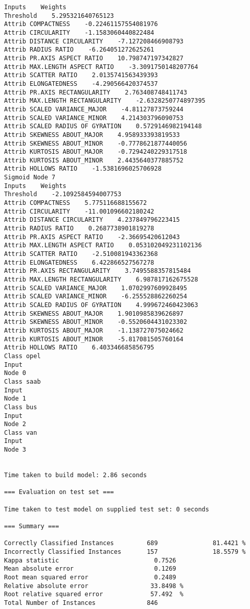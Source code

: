 \documentclass[
	article,			%
	11pt,				%
	oneside,			%
	a4paper,			%
	english,			%
	brazil,				%
	sumario=tradicional
	]{abntex2}
\begin{document}
\begin{lstlisting}
Inputs    Weights
Threshold    5.295321640765123
Attrib COMPACTNESS    -0.22461157554081976
Attrib CIRCULARITY    -1.1583060440822484
Attrib DISTANCE CIRCULARITY    -7.127208466908793
Attrib RADIUS RATIO    -6.264051272625261
Attrib PR.AXIS ASPECT RATIO    10.798747197342827
Attrib MAX.LENGTH ASPECT RATIO    -3.3091750148207764
Attrib SCATTER RATIO    2.0135741563439393
Attrib ELONGATEDNESS    -4.290566420374537
Attrib PR.AXIS RECTANGULARITY    2.763408748411743
Attrib MAX.LENGTH RECTANGULARITY    -2.6328250774897395
Attrib SCALED VARIANCE_MAJOR    -4.81127873759244
Attrib SCALED VARIANCE_MINOR    4.214303796090753
Attrib SCALED RADIUS OF GYRATION    0.5729146982194148
Attrib SKEWNESS ABOUT_MAJOR    4.958933393819533
Attrib SKEWNESS ABOUT_MINOR    -0.7778621877440056
Attrib KURTOSIS ABOUT_MAJOR    -0.7294240229317518
Attrib KURTOSIS ABOUT_MINOR    2.4435640377885752
Attrib HOLLOWS RATIO    -1.5381696025706928
Sigmoid Node 7
Inputs    Weights
Threshold    -2.1092584594007753
Attrib COMPACTNESS    5.775116688155672
Attrib CIRCULARITY    -11.001096602180242
Attrib DISTANCE CIRCULARITY    4.237849796223415
Attrib RADIUS RATIO    0.2687738901819278
Attrib PR.AXIS ASPECT RATIO    -2.36695420612043
Attrib MAX.LENGTH ASPECT RATIO    0.053102049231102136
Attrib SCATTER RATIO    -2.510081943362368
Attrib ELONGATEDNESS    6.422866527567278
Attrib PR.AXIS RECTANGULARITY    3.7495588357815484
Attrib MAX.LENGTH RECTANGULARITY    6.987817162675528
Attrib SCALED VARIANCE_MAJOR    1.0702997609928495
Attrib SCALED VARIANCE_MINOR    -6.255528862260254
Attrib SCALED RADIUS OF GYRATION    4.999672460423063
Attrib SKEWNESS ABOUT_MAJOR    1.9010985839626897
Attrib SKEWNESS ABOUT_MINOR    -0.5520604431023302
Attrib KURTOSIS ABOUT_MAJOR    -1.138727075024662
Attrib KURTOSIS ABOUT_MINOR    -5.817081505760164
Attrib HOLLOWS RATIO    6.403346685856795
Class opel
Input
Node 0
Class saab
Input
Node 1
Class bus
Input
Node 2
Class van
Input
Node 3


Time taken to build model: 2.86 seconds

=== Evaluation on test set ===

Time taken to test model on supplied test set: 0 seconds

=== Summary ===

Correctly Classified Instances         689               81.4421 %
Incorrectly Classified Instances       157               18.5579 %
Kappa statistic                          0.7526
Mean absolute error                      0.1269
Root mean squared error                  0.2489
Relative absolute error                 33.8498 %
Root relative squared error             57.492  %
Total Number of Instances              846     


\end{lstlisting}
\end{document}
